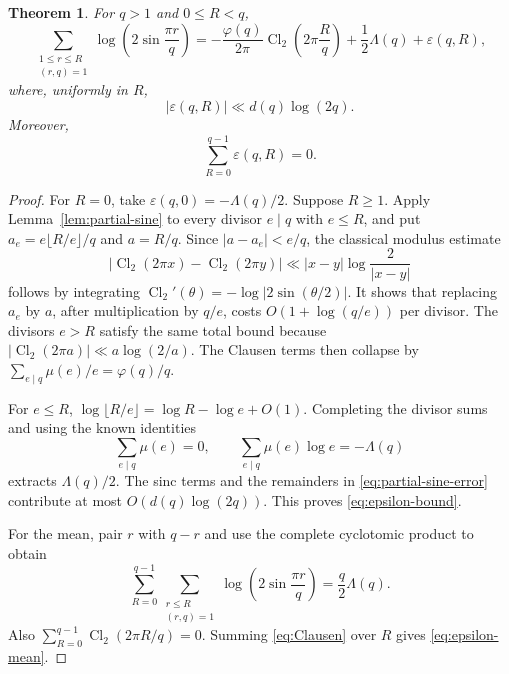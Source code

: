 \documentclass[11pt]{amsart}
\numberwithin{equation}{section}
\newtheorem{theorem}{Theorem}[section]
\theoremstyle{definition}
\theoremstyle{remark}
\newcommand{\eps}{\varepsilon}
\begin{document}
\begin{theorem}\label{thm:Clausen}
For \(q>1\) and \(0\leq R<q\),
\begin{equation}\label{eq:Clausen}
 \sum_{\substack{1\leq r\leq R\\(r,q)=1}}
 \log\!\left(2\sin\frac{\pi r}{q}\right)
 =-\frac{\varphi(q)}{2\pi}
 \operatorname{Cl}_2\!\left(2\pi\frac Rq\right)
 +\frac12\Lambda(q)+\eps(q,R),
\end{equation}
where, uniformly in \(R\),
\begin{equation}\label{eq:epsilon-bound}
 |\eps(q,R)|\ll d(q)\log(2q).
\end{equation}
Moreover,
\begin{equation}\label{eq:epsilon-mean}
 \sum_{R=0}^{q-1}\eps(q,R)=0.
\end{equation}
\end{theorem}

\begin{proof}
For \(R=0\), take \(\eps(q,0)=-\Lambda(q)/2\).  Suppose \(R\geq1\).
Apply Lemma~\ref{lem:partial-sine} to every divisor \(e\mid q\) with
\(e\leq R\), and put
\(a_e=e\lfloor R/e\rfloor/q\) and \(a=R/q\).  Since
\(|a-a_e|<e/q\), the classical modulus estimate
\[
 |\operatorname{Cl}_2(2\pi x)-\operatorname{Cl}_2(2\pi y)|
 \ll |x-y|\log\frac{2}{|x-y|}
\]
follows by integrating
\(\operatorname{Cl}_2'(\theta)=-\log|2\sin(\theta/2)|\).  It shows that
replacing \(a_e\) by \(a\), after multiplication by \(q/e\),
costs \(O(1+\log(q/e))\) per divisor.  The divisors \(e>R\) satisfy the
same total bound because
\(|\operatorname{Cl}_2(2\pi a)|\ll a\log(2/a)\).  The Clausen terms then
collapse by
\(\sum_{e\mid q}\mu(e)/e=\varphi(q)/q\).

For \(e\leq R\),
\(\log\lfloor R/e\rfloor=\log R-\log e+O(1)\).  Completing the divisor
sums and using the known identities
\[
 \sum_{e\mid q}\mu(e)=0,
 \qquad \sum_{e\mid q}\mu(e)\log e=-\Lambda(q)
\]
extracts \(\Lambda(q)/2\).  The sinc terms and the remainders in
\eqref{eq:partial-sine-error} contribute at most
\(O(d(q)\log(2q))\).  This proves \eqref{eq:epsilon-bound}.

For the mean, pair \(r\) with \(q-r\) and use the complete cyclotomic
product to obtain
\[
 \sum_{R=0}^{q-1}\sum_{\substack{r\leq R\\(r,q)=1}}
 \log\!\left(2\sin\frac{\pi r}{q}\right)=\frac q2\Lambda(q).
\]
Also \(\sum_{R=0}^{q-1}\operatorname{Cl}_2(2\pi R/q)=0\).  Summing
\eqref{eq:Clausen} over \(R\) gives \eqref{eq:epsilon-mean}.
\end{proof}
\end{document}
